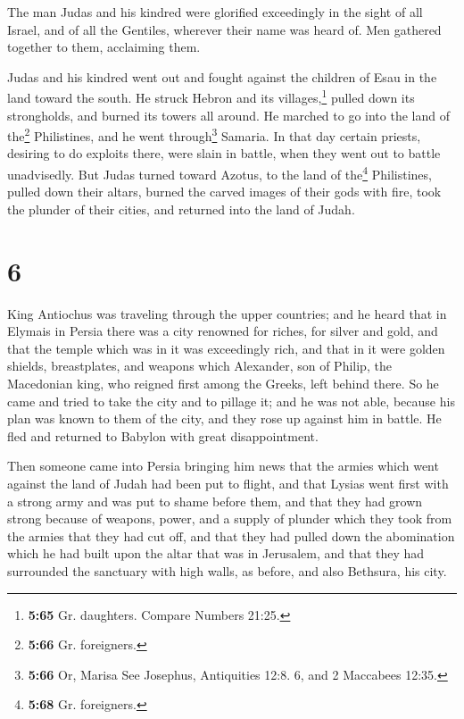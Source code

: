  The man Judas and his kindred were glorified exceedingly
in the sight of all Israel, and of all the Gentiles, wherever their name
was heard of.  Men gathered together to them, acclaiming
them.

 Judas and his kindred went out and fought against the
children of Esau in the land toward the south. He struck Hebron and its
villages,\footnote{\textbf{5:65} Gr. daughters. Compare Numbers 21:25.}
pulled down its strongholds, and burned its towers all around.
 He marched to go into the land of the\footnote{\textbf{5:66}
  Gr. foreigners.} Philistines, and he went through\footnote{\textbf{5:66}
  Or, Marisa See Josephus, Antiquities 12:8. 6, and 2 Maccabees 12:35.}
Samaria.  In that day certain priests, desiring to do
exploits there, were slain in battle, when they went out to battle
unadvisedly.  But Judas turned toward Azotus, to the land
of the\footnote{\textbf{5:68} Gr. foreigners.} Philistines, pulled down
their altars, burned the carved images of their gods with fire, took the
plunder of their cities, and returned into the land of Judah.

\hypertarget{section-5}{%
\section{6}\label{section-5}}

 King Antiochus was traveling through the upper countries;
and he heard that in Elymais in Persia there was a city renowned for
riches, for silver and gold,  and that the temple which
was in it was exceedingly rich, and that in it were golden shields,
breastplates, and weapons which Alexander, son of Philip, the Macedonian
king, who reigned first among the Greeks, left behind there.
 So he came and tried to take the city and to pillage it;
and he was not able, because his plan was known to them of the city,
 and they rose up against him in battle. He fled and
returned to Babylon with great disappointment.

 Then someone came into Persia bringing him news that the
armies which went against the land of Judah had been put to flight,
 and that Lysias went first with a strong army and was put
to shame before them, and that they had grown strong because of weapons,
power, and a supply of plunder which they took from the armies that they
had cut off,  and that they had pulled down the
abomination which he had built upon the altar that was in Jerusalem, and
that they had surrounded the sanctuary with high walls, as before, and
also Bethsura, his city.

